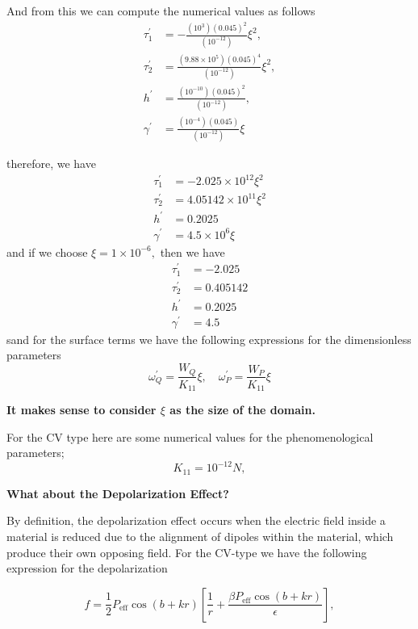 \documentclass[oneside,english]{amsart}
\numberwithin{equation}{section}
\numberwithin{figure}{section}
\begin{document}
And from this we can compute the numerical values as follows
\begin{align*}
\tau_{1}^{\prime} & =-\frac{\left(10^{3}\right)\left(0.045\right)^{2}}{\left(10^{-12}\right)}\xi^{2},\\
\tau_{2}^{\prime} & =\frac{\left(9.88\times10^{5}\right)\left(0.045\right)^{4}}{\left(10^{-12}\right)}\xi^{2},\\
h^{\prime} & =\frac{\left(10^{-10}\right)\left(0.045\right)^{2}}{\left(10^{-12}\right)},\\
\gamma^{\prime} & =\frac{\left(10^{-4}\right)\left(0.045\right)}{\left(10^{-12}\right)}\xi
\end{align*}

therefore, we have 
\begin{align*}
\tau_{1}^{\prime} & =-2.025\times10^{12}\xi^{2}\\
\tau_{2}^{\prime} & =4.05142\times10^{11}\xi^{2}\\
h^{\prime} & =0.2025\\
\gamma^{\prime} & =4.5\times10^{6}\xi
\end{align*}
and if we choose $\xi=1\times10^{-6},$ then we have
\begin{align*}
\tau_{1}^{\prime} & =-2.025\\
\tau_{2}^{\prime} & =0.405142\\
h^{\prime} & =0.2025\\
\gamma^{\prime} & =4.5
\end{align*}
 sand for the surface terms we have $ $the following expressions
for the dimensionless parameters
\[
\omega_{Q}^{\prime}=\frac{W_{Q}}{K_{11}}\xi,\hspace{1em}\omega_{P}^{\prime}=\frac{W_{P}}{K_{11}}\xi
\]

\textbf{It makes sense to consider $\xi$ as the size of the domain.}

For the CV type here are some numerical values for the phenomenological
parameters;
\[
K_{11}=10^{-12}N,
\]

\textbf{What about the Depolarization Effect?}

By definition, the depolarization effect occurs when the electric
field inside a material is reduced due to the alignment of dipoles
within the material, which produce their own opposing field. For the
CV-type we have the following expression for the depolarization

\[
f=\frac{1}{2}P_{\text{eff}}\cos\left(b+kr\right)\left[\frac{1}{r}+\frac{\beta P_{\text{eff}}\cos\left(b+kr\right)}{\epsilon}\right],
\]
\end{document}
